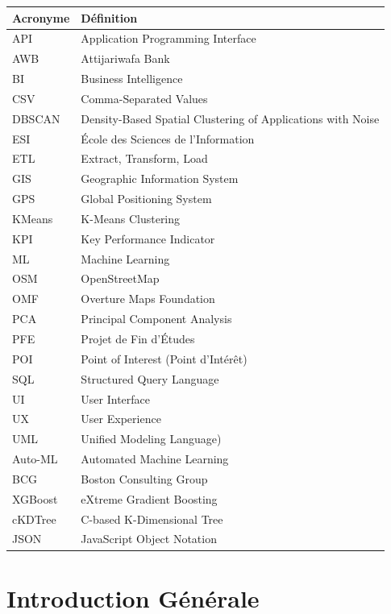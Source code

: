 \documentclass[11pt,a4paper,twoside]{report}
\begin{document}
\begin{tabular}{@{}lp{11cm}@{}}
\toprule
\textbf{Acronyme} & \textbf{Définition} \\
\midrule
API    & Application Programming Interface \\
AWB    & Attijariwafa Bank \\
BI     & Business Intelligence \\
CSV    & Comma-Separated Values \\
DBSCAN & Density-Based Spatial Clustering of Applications with Noise \\
ESI    & École des Sciences de l'Information \\
ETL    & Extract, Transform, Load \\
GIS    & Geographic Information System \\
GPS    & Global Positioning System \\
KMeans & K-Means Clustering \\
KPI    & Key Performance Indicator \\
ML     & Machine Learning \\
OSM    & OpenStreetMap \\
OMF    & Overture Maps Foundation \\
PCA    & Principal Component Analysis \\
PFE    & Projet de Fin d'Études \\
POI    & Point of Interest (Point d'Intérêt) \\
SQL    & Structured Query Language \\
UI     & User Interface \\
UX     & User Experience \\
UML    & Unified Modeling Language) \\
Auto-ML& Automated Machine Learning \\
BCG    & Boston Consulting Group \\
XGBoost& eXtreme Gradient Boosting \\
cKDTree& C-based K-Dimensional Tree \\
JSON   & JavaScript Object Notation \\
\bottomrule
\end{tabular}

\newpage

\chapter*{Introduction Générale}
\end{document}
